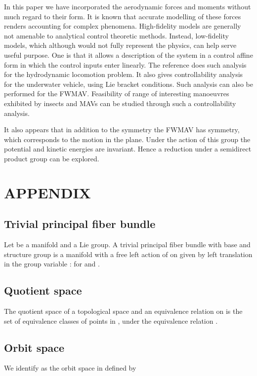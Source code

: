 \documentclass[letterpaper, 10 pt, conference]{ieeeconf}  \newcommand{\RN}[1]{\textup{\uppercase\expandafter{\romannumeral#1}}}
\begin{document}
In this paper we have incorporated the aerodynamic forces and moments without much regard to their form. It is known that accurate modelling of these forces renders accounting for complex phenomena. High-fidelity models are generally not amenable to analytical control theoretic methods. Instead, low-fidelity models, which although would not fully represent the physics, can help serve useful purpose. One is that it allows a description of the system in a control affine form in which the control inputs enter linearly. The reference \cite{Morgansen UUV} does such analysis for the hydrodynamic locomotion problem. It also gives controllability analysis for the underwater vehicle, using Lie bracket conditions. Such analysis can also be performed for the FWMAV. Feasibility of range of interesting manoeuvres exhibited by insects and MAVs can be studied through such a controllability analysis.

It also appears that in addition to the  symmetry the FWMAV has  symmetry, which corresponds to the motion in the  plane. Under the action of this  group the potential and kinetic energies are invariant. Hence a reduction under a semidirect product group  can be explored.



\section*{APPENDIX}

\subsection{Trivial principal fiber bundle}\label{Trivial principal fiber bundle}
Let  be a manifold and  a Lie group. A trivial principal fiber bundle with base  and structure group  is a manifold  with a free left action of  on  given by left translation in the group variable :  for  and .


\subsection{Quotient space}\label{Quotient space}
The quotient space  of a topological space  and an equivalence relation  on  is the set of equivalence classes of points in , under the equivalence relation .

\subsection{Orbit space}\label{Orbit space}
We identify  as the orbit space  in  defined by
\end{document}
